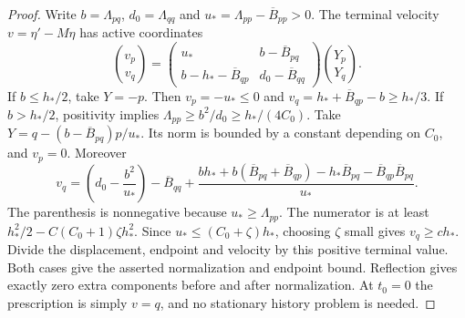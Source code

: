 \begin{proof}
Write $b=\Lambda_{pq}$, $d_0=\Lambda_{qq}$ and
$u_*=\Lambda_{pp}-\overline B_{pp}>0$. The terminal velocity
$v=\eta'-M\eta$ has active coordinates
\[
 \binom{v_p}{v_q}=
 \begin{pmatrix}u_*&b-\overline B_{pq}\\
 b-h_*-\overline B_{qp}&d_0-\overline B_{qq}\end{pmatrix}
 \binom{Y_p}{Y_q}.
\]
If $b\leq h_*/2$, take $Y=-p$. Then $v_p=-u_*\leq0$ and
$v_q=h_*+\overline B_{qp}-b\geq h_*/3$.
If $b>h_*/2$, positivity implies
$\Lambda_{pp}\geq b^2/d_0\geq h_*/(4C_0)$.
Take $Y=q-(b-\overline B_{pq})p/u_*$. Its norm is bounded by a
constant depending on $C_0$, and $v_p=0$. Moreover
\[
 v_q=\left(d_0-\frac{b^2}{u_*}\right)-\overline B_{qq}
 +\frac{bh_*+b(\overline B_{pq}+\overline B_{qp})
       -h_*\overline B_{pq}-\overline B_{qp}\overline B_{pq}}{u_*}.
\]
The parenthesis is nonnegative because $u_*\geq\Lambda_{pp}$.
The numerator is at least $h_*^2/2-C(C_0+1)\zeta h_*^2$.
Since $u_*\leq(C_0+\zeta)h_*$, choosing $\zeta$ small gives
$v_q\geq c h_*$. Divide the displacement, endpoint and velocity by
this positive terminal value. Both cases give the asserted normalization
and endpoint bound. Reflection gives exactly zero extra components
before and after normalization. At $t_0=0$ the prescription is simply
$v=q$, and no stationary history problem is needed.
\end{proof}

